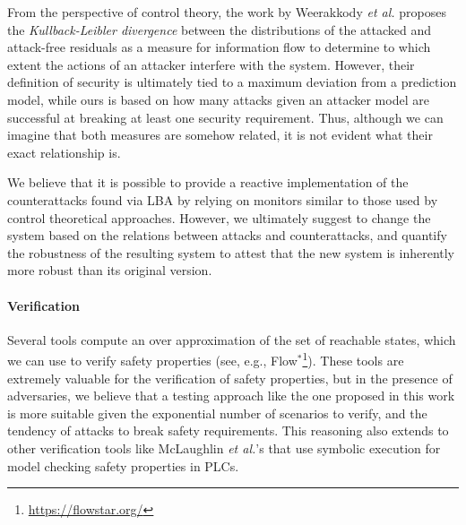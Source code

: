 {{From the perspective of control theory, the work by Weerakkody \emph{et al.} \cite{IFCPSSec} proposes the \emph{Kullback-Leibler divergence} between the distributions of the attacked and attack-free residuals as {a measure for information flow} to determine to which extent the actions of an attacker interfere with the system. However, their definition of security is ultimately tied to a maximum deviation from a prediction model, while ours is based on how many attacks given an attacker model are successful at breaking at least one security requirement. Thus, although we can imagine that both measures are somehow related, it is not evident what their exact relationship is.

We believe that it is possible to provide a reactive implementation of the counterattacks found via LBA by relying on monitors similar to those used by control theoretical approaches. However, we ultimately suggest to change the system based on the relations between attacks and counterattacks, and quantify the robustness of the resulting system to attest that the new system is inherently more robust than its original version.
 

\paragraph{Verification}
Several tools compute an over approximation of the set of reachable states, which we can use to verify safety properties (see, e.g., Flow$^*$\footnote{\url{https://flowstar.org/}}). 
These tools are extremely valuable for the verification of safety properties, but in the presence of adversaries, we believe that a testing approach like the one proposed in this work is more suitable given the exponential number of scenarios to verify, and the tendency of attacks to break safety requirements. This reasoning also extends to other verification tools like McLaughlin \emph{et al.}'s \cite{TSVPLC} that use symbolic execution for model checking safety properties in PLCs.

{
}
}}
